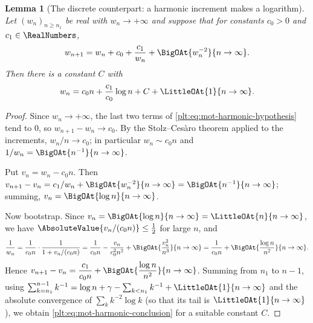 \documentclass[11pt,oneside]{article}
\theoremstyle{plain}
\newtheorem{lemma}[theorem]{Lemma}
\theoremstyle{definition}
\theoremstyle{remark}
\begin{document}
\begin{lemma}[The discrete counterpart: a harmonic increment makes a logarithm]
\label{plt:lem:mot-harmonic}
Let \((w_{n})_{n\ge n_{1}}\) be real with \(w_{n}\to+\infty\) and suppose that
for constants \(c_{0}>0\) and \(c_{1}\in\RealNumbers\),
\begin{equation}\label{plt:eq:mot-harmonic-hypothesis}
  w_{n+1}=w_{n}+c_{0}+\frac{c_{1}}{w_{n}}
   +\BigOAt{w_{n}^{-2}}{n\to\infty}.
\end{equation}
Then there is a constant \(C\) with
\begin{equation}\label{plt:eq:mot-harmonic-conclusion}
  w_{n}=c_{0}n+\frac{c_{1}}{c_{0}}\log n+C+\LittleOAt{1}{n\to\infty}.
\end{equation}
\end{lemma}

\begin{proof}
Since \(w_{n}\to+\infty\), the last two terms of
\eqref{plt:eq:mot-harmonic-hypothesis} tend to \(0\), so
\(w_{n+1}-w_{n}\to c_{0}\).  By the Stolz--Cesàro theorem applied to the
increments, \(w_{n}/n\to c_{0}\); in particular \(w_{n}\sim c_{0}n\) and
\(1/w_{n}=\BigOAt{n^{-1}}{n\to\infty}\).

Put \(v_{n}=w_{n}-c_{0}n\).  Then
\(v_{n+1}-v_{n}=c_{1}/w_{n}+\BigOAt{w_{n}^{-2}}{n\to\infty}
=\BigOAt{n^{-1}}{n\to\infty}\); summing, \(v_{n}=\BigOAt{\log n}{n\to\infty}\).

Now bootstrap.  Since \(v_{n}=\BigOAt{\log n}{n\to\infty}=\LittleOAt{n}{n\to\infty}\),
we have \(\AbsoluteValue{v_{n}/(c_{0}n)}\le\tfrac12\) for large \(n\), and
\[
  \frac{1}{w_{n}}
  =\frac{1}{c_{0}n}\cdot\frac{1}{1+v_{n}/(c_{0}n)}
  =\frac{1}{c_{0}n}-\frac{v_{n}}{c_{0}^{2}n^{2}}
   +\BigOAt{\frac{v_{n}^{2}}{n^{3}}}{n\to\infty}
  =\frac{1}{c_{0}n}+\BigOAt{\frac{\log n}{n^{2}}}{n\to\infty}.
\]
Hence
\(v_{n+1}-v_{n}=\dfrac{c_{1}}{c_{0}n}
 +\BigOAt{\dfrac{\log n}{n^{2}}}{n\to\infty}\).  Summing from \(n_{1}\) to
\(n-1\), using
\(\sum_{k=n_{1}}^{n-1}k^{-1}=\log n+\gamma-\sum_{k<n_{1}}k^{-1}
+\LittleOAt{1}{n\to\infty}\) and the absolute convergence of
\(\sum_{k}k^{-2}\log k\) (so that its tail is \(\LittleOAt{1}{n\to\infty}\)),
we obtain \eqref{plt:eq:mot-harmonic-conclusion} for a suitable constant
\(C\).
\end{proof}
\end{document}
